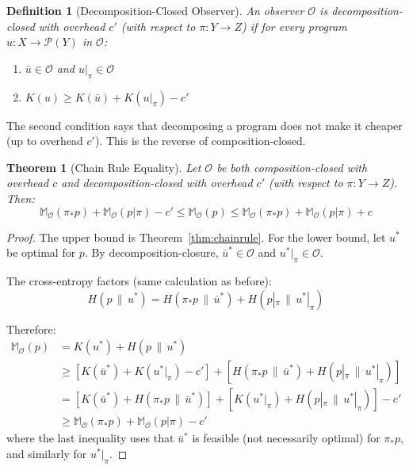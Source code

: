 \documentclass[11pt]{article}
\newtheorem{definition}{Definition}
\newtheorem{theorem}{Theorem}
\begin{document}
\begin{definition}[Decomposition-Closed Observer]
An observer $\mathcal{O}$ is \emph{decomposition-closed with overhead $c'$} (with respect to $\pi: Y \to Z$) if for every program $u: X \to \mathcal{P}(Y)$ in $\mathcal{O}$:
\begin{enumerate}
    \item $\bar{u} \in \mathcal{O}$ and $u|_\pi \in \mathcal{O}$
    \item $K(u) \geq K(\bar{u}) + K(u|_\pi) - c'$
\end{enumerate}
\end{definition}

The second condition says that decomposing a program does not make it cheaper (up to overhead $c'$). This is the reverse of composition-closed.

\begin{theorem}[Chain Rule Equality]\label{thm:chainrule-equality}
Let $\mathcal{O}$ be both composition-closed with overhead $c$ and decomposition-closed with overhead $c'$ (with respect to $\pi: Y \to Z$). Then:
\[ \mathbb{M}_\mathcal{O}(\pi_* p) + \mathbb{M}_\mathcal{O}(p|\pi) - c' \leq \mathbb{M}_\mathcal{O}(p) \leq \mathbb{M}_\mathcal{O}(\pi_* p) + \mathbb{M}_\mathcal{O}(p|\pi) + c \]
\end{theorem}

\begin{proof}
The upper bound is Theorem~\ref{thm:chainrule}. For the lower bound, let $u^*$ be optimal for $p$. By decomposition-closure, $\bar{u}^* \in \mathcal{O}$ and $u^*|_\pi \in \mathcal{O}$.

The cross-entropy factors (same calculation as before):
\[ H(p \,\|\, u^*) = H(\pi_* p \,\|\, \bar{u}^*) + H(p|_\pi \,\|\, u^*|_\pi) \]

Therefore:
\begin{align}
\mathbb{M}_\mathcal{O}(p) &= K(u^*) + H(p \,\|\, u^*) \\
&\geq [K(\bar{u}^*) + K(u^*|_\pi) - c'] + [H(\pi_* p \,\|\, \bar{u}^*) + H(p|_\pi \,\|\, u^*|_\pi)] \\
&= [K(\bar{u}^*) + H(\pi_* p \,\|\, \bar{u}^*)] + [K(u^*|_\pi) + H(p|_\pi \,\|\, u^*|_\pi)] - c' \\
&\geq \mathbb{M}_\mathcal{O}(\pi_* p) + \mathbb{M}_\mathcal{O}(p|\pi) - c'
\end{align}
where the last inequality uses that $\bar{u}^*$ is feasible (not necessarily optimal) for $\pi_* p$, and similarly for $u^*|_\pi$.
\end{proof}
\end{document}
